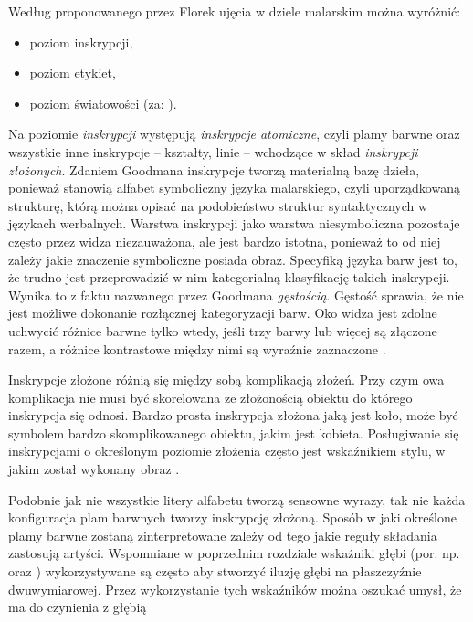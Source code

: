 \documentclass[licencjacka]{kdypl}
\begin{document}
Według proponowanego przez Florek ujęcia w dziele malarskim można wyróżnić:
\begin{itemize}
    \item poziom inskrypcji,
    \item poziom etykiet,
    \item poziom światowości (za: \citealt[s. 388]{Florek2006}).
\end{itemize}


 Na poziomie \textit{inskrypcji} występują \textit{inskrypcje atomiczne}, czyli plamy barwne oraz wszystkie inne inskrypcje -- kształty, linie -- wchodzące w skład \textit{inskrypcji złożonych}. Zdaniem Goodmana inskrypcje tworzą materialną bazę dzieła, ponieważ stanowią alfabet symboliczny języka malarskiego, czyli uporządkowaną strukturę, którą można opisać na podobieństwo struktur syntaktycznych w językach werbalnych. Warstwa inskrypcji jako warstwa niesymboliczna pozostaje często przez widza niezauważona, ale jest bardzo istotna, ponieważ to od niej zależy jakie znaczenie symboliczne posiada obraz. Specyfiką języka barw jest to, że trudno jest przeprowadzić w nim kategorialną klasyfikację takich inskrypcji. Wynika to z faktu nazwanego przez Goodmana \textit{gęstością}. Gęstość sprawia, że nie jest możliwe dokonanie rozłącznej kategoryzacji barw. Oko widza jest zdolne uchwycić różnice barwne tylko wtedy, jeśli trzy barwy lub więcej są złączone razem, a różnice kontrastowe między nimi są wyraźnie zaznaczone \citep[s. 389]{Florek2006}.
 
Inskrypcje złożone różnią się między sobą komplikacją złożeń. Przy czym owa komplikacja nie musi być skorelowana ze złożonością obiektu do którego inskrypcja się odnosi. Bardzo prosta inskrypcja złożona jaką jest koło, może być symbolem bardzo skomplikowanego obiektu, jakim jest kobieta. Posługiwanie się inskrypcjami o określonym poziomie złożenia często jest wskaźnikiem stylu, w jakim został wykonany obraz \citep[s. 390]{Florek2006}.

Podobnie jak nie wszystkie litery alfabetu tworzą sensowne wyrazy, tak nie każda konfiguracja plam barwnych tworzy inskrypcję złożoną. Sposób w jaki określone plamy barwne zostaną zinterpretowane zależy od tego jakie reguły składania zastosują artyści. Wspomniane w poprzednim rozdziale wskaźniki głębi (por. np. \citealt[s. 25]{Deregowski} oraz \citealt[s. 53]{Hochberg1970}) wykorzystywane są często aby stworzyć iluzję głębi na płaszczyźnie dwuwymiarowej. Przez wykorzystanie tych wskaźników można oszukać umysł, że ma do czynienia z głębią \citep[s. 391]{Florek2006}
\end{document}

